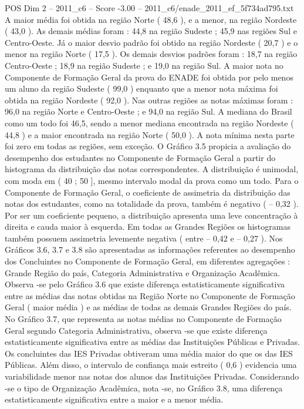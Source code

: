 \begin{textsample}{POS Dim 2 – 2011\_c6 – Score -3.00 – 2011\_c6/enade\_2011\_ef\_5f734ad795.txt}
A maior média foi obtida na região Norte ( 48,6 ), e a menor, na região Nordeste ( 43,0 ).
As demais médias foram : 44,8 na região Sudeste ; 45,9 nas regiões Sul e Centro-Oeste.
Já o maior desvio padrão foi obtido na região Nordeste ( 20,7 ) e o menor na região Norte ( 17,5 ).
Os demais desvios padrões foram : 18,7 na região Centro-Oeste ; 18,9 na região Sudeste ; e 19,0 na região Sul.
A maior nota no Componente de Formação Geral da prova do ENADE foi obtida por pelo menos um aluno da região Sudeste ( 99,0 ) enquanto que a menor nota máxima foi obtida na região Nordeste ( 92,0 ).
Nas outras regiões as notas máximas foram : 96,0 na região Norte e Centro-Oeste ; e 94,0 na região Sul.
A mediana do Brasil como um todo foi 46,5, sendo a menor mediana encontrada na região Nordeste ( 44,8 ) e a maior encontrada na região Norte ( 50,0 ).
A nota mínima nesta parte foi zero em todas as regiões, sem exceção.
O Gráfico 3.5 propicia a avaliação do desempenho dos estudantes no Componente de Formação Geral a partir do histograma da distribuição das notas correspondentes.
A distribuição é unimodal, com moda em ( 40 ; 50 ], mesmo intervalo modal da prova como um todo.
Para o Componente de Formação Geral, o coeficiente de assimetria da distribuição das notas dos estudantes, como na totalidade da prova, também é negativo ( – 0,32 ).
Por ser um coeficiente pequeno, a distribuição apresenta uma leve concentração à direita e cauda maior à esquerda.
Em todas as Grandes Regiões os histogramas também possuem assimetria levemente negativa ( entre – 0,42 e – 0,27 ).
Nos Gráficos 3.6, 3.7 e 3.8 são apresentadas as informações referentes ao desempenho dos Concluintes no Componente de Formação Geral, em diferentes agregações : Grande Região do país, Categoria Administrativa e Organização Acadêmica.
Observa -se pelo Gráfico 3.6 que existe diferença estatisticamente significativa entre as médias das notas obtidas na Região Norte no Componente de Formação Geral ( maior média ) e as médias de todas as demais Grandes Regiões do país.
No Gráfico 3.7, que representa as notas médias no Componente de Formação Geral segundo Categoria Administrativa, observa -se que existe diferença estatisticamente significativa entre as médias das Instituições Públicas e Privadas.
Os concluintes das IES Privadas obtiveram uma média maior do que os das IES Públicas.
Além disso, o intervalo de confiança mais estreito ( 0,6 ) evidencia uma variabilidade menor nas notas dos alunos das Instituições Privadas.
Considerando -se o tipo de Organização Acadêmica, nota -se, no Gráfico 3.8, uma diferença estatisticamente significativa entre a maior e a menor média.

\end{textsample}
